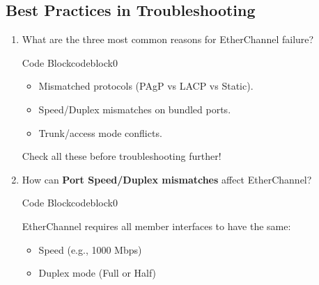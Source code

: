 \documentclass[a4paper]{article}
\begin{document}
\subsection{Best Practices in Troubleshooting}
\begin{enumerate}
	\item What are the three most common reasons for EtherChannel failure?


	      \begin{ocg}{Code Block}{codeblock}{0}

		      \vspace{0.5cm}

		      \begin{tcolorbox}
			      \begin{itemize}
				      \item Mismatched protocols (PAgP vs LACP vs Static).
				      \item Speed/Duplex mismatches on bundled ports.
				      \item Trunk/access mode conflicts.
			      \end{itemize}
		      \end{tcolorbox}

		      \begin{tcolorbox}
			      Check all these before troubleshooting further!
		      \end{tcolorbox}



		      \vspace{0.5cm}
	      \end{ocg}


	\item How can \textbf{Port Speed/Duplex mismatches} affect EtherChannel?



	      \begin{ocg}{Code Block}{codeblock}{0}

		      \vspace{0.5cm}
		      EtherChannel requires all member interfaces to have the same:


		      \begin{tcolorbox}
			      \begin{itemize}
				      \item Speed (e.g., 1000 Mbps)
				      \item Duplex mode (Full or Half)
			      \end{itemize}
		      \end{tcolorbox}



\end{ocg}
\end{enumerate}
\end{document}

